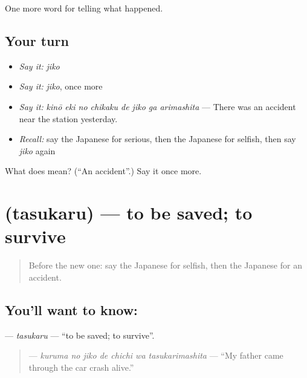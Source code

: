 \begin{grammarlens}[title={What you've built}]
One more word for telling what happened.
\end{grammarlens}

\subsection*{Your turn}
\begin{itemize}
\raggedright
  \item \emph{Say it:} \emph{jiko}
  \item \emph{Say it:} \emph{jiko}, once more
  \item \emph{Say it:} \emph{kinō eki no chikaku de jiko ga arimashita} — There was an accident near the station yesterday.
  \item \emph{Recall:} say the Japanese for serious, then the Japanese for selfish, then say \emph{jiko} again
\end{itemize}

\begin{tcolorbox}[breakable,colback=teal!4,colframe=teal!35!black,title={Before you move on}]
What does  mean? (\textquotedblleft{}An accident\textquotedblright{}.) Say it once more.
\end{tcolorbox}
\section[\texorpdfstring{\ja{たすかる} (tasukaru)}{たすかる (tasukaru)}]{ (tasukaru) — to be saved; to survive}

\label{lesson:JA-C262-tasukaru}



\begin{quote}
Before the new one: say the Japanese for selfish, then the Japanese for an accident.
\end{quote}

\subsection*{You'll want to know: }
\textbf{} — \emph{tasukaru} — \textquotedblleft{}to be saved; to survive\textquotedblright{}.

\begin{quote}
\textbf{   } — \emph{kuruma no jiko de chichi wa tasukarimashita} — \textquotedblleft{}My father came through the car crash alive.\textquotedblright{}
\end{quote}

